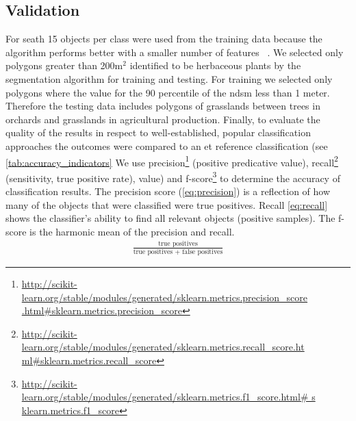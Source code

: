 \documentclass[authoryear,preprint,12pt,number]{elsarticle}
\begin{document}
\subsection{Validation} 
\label{subsec:Validation}
For \gls{seath} 15 objects per class were used from the training data 
because the algorithm performs better with a smaller number of features 
~\citep{Nussbaum2006}. We selected only polygons greater than 200m$^{2}$ 
identified to be herbaceous plants by the segmentation algorithm for training 
and testing. For training we selected only polygons where the value for the 90 
percentile of the \gls{ndsm} less than 1 meter. Therefore the testing data 
includes polygons of grasslands between trees in orchards and grasslands in 
agricultural production. Finally, to evaluate the quality of the results in 
respect to well-established, popular classification approaches the outcomes 
were compared to an \gls{et} reference classification (see 
\ref{tab:accuracy_indicators}
We use precision\footnote{\url{
http://scikit-learn.org/stable/modules/generated/sklearn.metrics.precision_score
.html\#sklearn.metrics.precision\_score}} (positive predicative value), 
recall\footnote{\url{
http://scikit-learn.org/stable/modules/generated/sklearn.metrics.recall_score.ht
ml\#sklearn.metrics.recall\_score}} (sensitivity, true positive rate), 
value) and 
f-score\footnote{\url{
http://scikit-learn.org/stable/modules/generated/sklearn.metrics.f1_score.html\#
s
klearn.metrics.f1\_score}} to determine the accuracy of classification results. 
The precision score (\ref{eq:precision}) is a reflection of how many of the 
objects that were classified were true positives. Recall \ref{eq:recall} shows 
the classifier's ability to find all relevant objects (positive samples). The 
f-score is the harmonic mean of the precision and recall.
\begin{equation}\label{eq:precision}
\begin{align*}
    \frac{\text{true positives}}{\text{true positives + false positives}}
\end{align*}
\end{equation}
\end{document}
